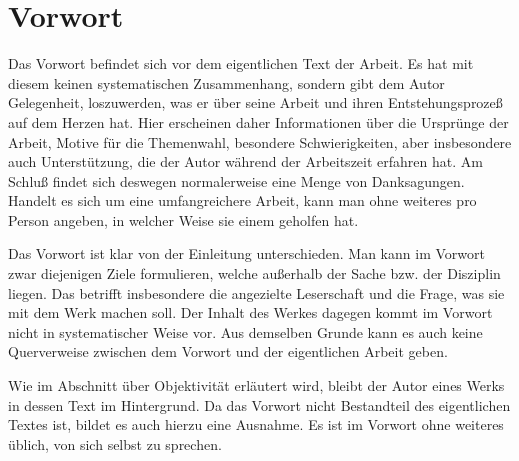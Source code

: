 \chapter*{Vorwort}
	\label{chap:vorwort}
	Das Vorwort befindet sich vor dem eigentlichen Text der Arbeit. Es hat mit diesem keinen systematischen Zusammenhang, sondern gibt dem Autor Gelegenheit, loszuwerden, was er über seine Arbeit und ihren Entstehungsprozeß auf dem Herzen hat. Hier erscheinen daher Informationen über die Ursprünge der Arbeit, Motive für die Themenwahl, besondere Schwierigkeiten, aber insbesondere auch Unterstützung, die der Autor während der Arbeitszeit erfahren hat. Am Schluß findet sich deswegen normalerweise eine Menge von Danksagungen. Handelt es sich um eine umfangreichere Arbeit, kann man ohne weiteres pro Person angeben, in welcher Weise sie einem geholfen hat.

Das Vorwort ist klar von der Einleitung unterschieden. Man kann im Vorwort zwar diejenigen Ziele formulieren, welche außerhalb der Sache bzw. der Disziplin liegen. Das betrifft insbesondere die angezielte Leserschaft und die Frage, was sie mit dem Werk machen soll. Der Inhalt des Werkes dagegen kommt im Vorwort nicht in systematischer Weise vor. Aus demselben Grunde kann es auch keine Querverweise zwischen dem Vorwort und der eigentlichen Arbeit geben.

Wie im Abschnitt über Objektivität erläutert wird, bleibt der Autor eines Werks in dessen Text im Hintergrund. Da das Vorwort nicht Bestandteil des eigentlichen Textes ist, bildet es auch hierzu eine Ausnahme. Es ist im Vorwort ohne weiteres üblich, von sich selbst zu sprechen.